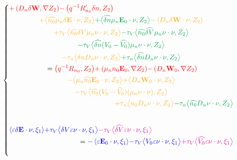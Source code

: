 \documentclass[a4paper,12pt, draft]{article}
\begin{document}
\begin{equation*}
\begin{dcases}
\begin{multlined}[b][.93\textwidth]
      {\color{red} + \left( D_n  \delta \mathbf{W}, \nabla Z_{2} \right)}
      {\color{red} -\left({q^{-1}}R_{n_0}'\delta n,Z_2\right)} \\
      {\color{Dandelion} + \big<\widehat{n_{0}} \mu_n \delta \mathbf{E} \cdot \nu, Z_{2} \big>}
      {\color{Green} + \big< \widehat{\delta n} \mu_n \mathbf{E}_{0} \cdot \nu, Z_{2} \big>}
      {\color{Dandelion} - \left< D_n \delta \mathbf{W} \cdot \nu, Z_{2} \right>}\\
    {\color{Dandelion} + \tau_V \big< \widehat{n_0} \delta V \mu_n \nu \cdot \nu, Z_{2} \big>}
      {\color{Green} - \tau_V \big< \widehat{n_0} \widehat{\delta V}\mu_n \nu\cdot\nu, Z_{2}\big>}\\
    {\color{Green} -\tau_V\big<\widehat{\delta n}(V_0-\widehat{V_0})\mu_n\nu\cdot\nu,Z_{2}\big>}\\
    {\color{Dandelion} - \tau_n \big< \delta n D_n \nu \cdot \nu, Z_{2} \big>}
      {\color{Green} + \tau_n \big<\widehat{\delta n} D_n \nu \cdot \nu, Z_{2} \big>} \\
    = {\color{red} \left({q^{-1}}R_{n_0}, Z_2\right)}
      {\color{red} + \left(\mu_n n_{0} \mathbf{E}_{0}, \nabla Z_{2} \right)}
      {\color{red} - \left(D_n\mathbf{W}_{0}, \nabla Z_{2} \right)} \\
    {\color{Dandelion} - \big<\mu_n \widehat{n_{0}}\mathbf{E}_{0}\cdot\nu,Z_{2}\big>}
      {\color{Dandelion} + \big< D_n \mathbf{W}_{0} \cdot \nu, Z_{2} \big>}\\
    {\color{Dandelion} - \tau_V \big<\widehat{n_0} (V_0 -\widehat{V}_0)(\mu_n \nu \cdot \nu),
        Z_{2}\big>}\\
    {\color{Dandelion}+ \tau_n \big< n_{0} D_n \nu \cdot \nu, Z_{2} \big>}
      {\color{Green} - \tau_n \big<\widehat{n_{0}} D_n \nu \cdot \nu, Z_{2} \big>}
  \end{multlined} \\[20pt]
  \begin{multlined}[b][.93\textwidth]
    {\color{blue}\left<\varepsilon \delta \mathbf{E} \cdot \nu, \xi_{1}\right>}
      {\color{blue} + \tau_V \big< \delta V \varepsilon \nu \cdot \nu, \xi_{1} \big>}
      {\color{Magenta} - \tau_V \big<\widehat{\delta V} \varepsilon \nu \cdot \nu, \xi_{1} \big>} \\
    = {\color{blue} -\left<\varepsilon \mathbf{E}_{0} \cdot \nu,\xi_{1}\right>}
      {\color{blue} - \tau_V \big< V_{0} \varepsilon \nu \cdot \nu, \xi_{1} \big>}
      {\color{Magenta} + \tau_V \big< \widehat{V_{0}} \varepsilon \nu \cdot \nu, \xi_{1} \big>}
  \end{multlined} \\[15pt]

\end{dcases}
\end{equation*}
\end{document}
